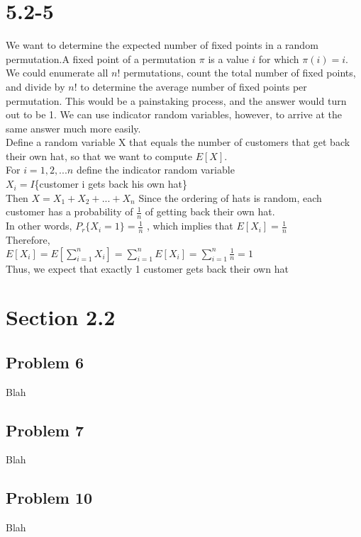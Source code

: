\documentclass{article}
\begin{document}
\section{5.2-5}
 We want to determine the expected number of fixed points in a random permutation.A fixed point of a permutation $\pi$ is a value $i$ for which $\pi(i) = i$.\\
 We could enumerate all $n!$ permutations, count the total number of fixed points, and divide by $n!$ to determine the average number of fixed points per permutation. This would be a painstaking process, and the answer would turn out to be 1. We can use indicator random variables, however, to arrive at the same answer much more easily.\\
Define a random variable X that equals the number of customers that get back their own hat, so that we want to compute $E[X]$.\\
For $i=1,2,...n$ define the indicator random variable\\
$X_i = I$\{customer i gets back his own hat\}\\
Then $X = X_1+X_2+...+X_n$
Since the ordering of hats is random, each customer has a probability of $\frac{1}{n}$ of getting back their own hat. \\
In other words, $P_r\{X_i=1\}=\frac{1}{n}$ , which implies that $E[X_i]=\frac{1}{n}$\\
Therefore,\\
$E[X_i]=E[\displaystyle\sum_{i=1}^{n}X_i]=\displaystyle\sum_{i=1}^{n}E[X_i]=\displaystyle\sum_{i=1}^{n}\frac{1}{n}=1$
\\
Thus, we expect that exactly 1 customer gets back their own hat

\section*{Section 2.2}
%
\subsection*{Problem 6}
Blah
\subsection*{Problem 7}
Blah
\subsection*{Problem 10}
Blah
\end{document}
